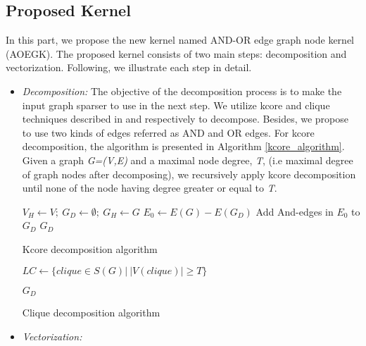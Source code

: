 \documentclass{esannV2}
\begin{document}
\subsection{Proposed Kernel}
In this part, we propose the new kernel named AND-OR edge graph node kernel (AOEGK). The proposed kernel consists of two main steps: decomposition and vectorization. Following, we illustrate each step in detail.
\begin{itemize}[leftmargin=*]
\item \textit{Decomposition:} The objective of the decomposition process is to make the input graph sparser to use in the next step. We utilize kcore and clique techniques described in \cite{kcore} and \cite{clique} respectively to decompose. Besides, we propose to use two kinds of edges referred as AND and OR edges. For kcore decomposition, the algorithm is presented in Algorithm \ref{kcore_algorithm}. Given a graph \textit{G=(V,E)} and a maximal node degree, \textit{T},  (i.e maximal degree of graph nodes after decomposing), we recursively apply kcore decomposition until none of the node having degree greater or equal to \textit{T}.

\begin{algorithm}[H]
\label{kcore_algorithm}
   $V_H \gets V;\ G_D \gets \emptyset;\ G_H \gets G$\;
  $E_0 \gets E(G) - E(G_D)$\;
  Add And-edges in $E_0$ to $G_D$\;
  \Return $G_D$
  \caption{Kcore decomposition algorithm}
\end{algorithm}

\begin{algorithm}[H]
\label{clique_algorithm}
   $LC \gets \lbrace clique \in S(G) | \ \vert V(clique) \vert \geq T \rbrace$\;
 
  \Return $G_D$
  \caption{Clique decomposition algorithm}
\end{algorithm}
\item \textit{Vectorization:}
\end{itemize}
\end{document}
